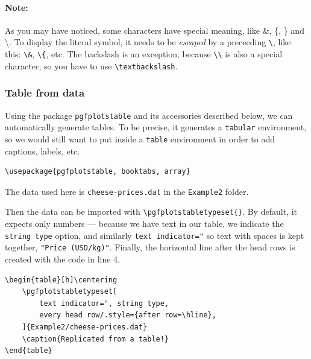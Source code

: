 \paragraph{Note:} As you may have noticed, some characters have special meaning, like \&, \{, \} and \textbackslash. To display the literal symbol, it needs to be \emph{escaped} by a preceeding \verb|\|, like this: \verb|\&|, \verb|\{|, etc. The backslash is an exception, because \verb|\\| is also a special character, so you have to use \verb|\textbackslash|.

\subsubsection{Table from data}
Using the package \texttt{pgfplotstable} and its accessories described below, we can automatically generate tables.
To be precise, it generates a \texttt{tabular} environment, so we would still want to put inside a \texttt{table} environment in order to add captions, labels, etc.
  
\begin{lstlisting}
\usepackage{pgfplotstable, booktabs, array}
\end{lstlisting}

The data used here is \texttt{cheese-prices.dat} in the \texttt{Example2} folder.


Then the data can be imported with \verb|\pgfplotstabletypeset{}|.
By default, it expects only numbers --- because we have text in our table, we indicate the \texttt{string type} option, and similarly \verb|text indicator="| so text with spaces is kept together, \verb|"Price (USD/kg)"|. 
Finally, the horizontal line after the head rows is created with the code in line 4.
\begin{lstlisting}
\begin{table}[h]\centering
    \pgfplotstabletypeset[
        text indicator=", string type,
        every head row/.style={after row=\hline},
    ]{Example2/cheese-prices.dat}
    \caption{Replicated from a table!}
\end{table}     
\end{lstlisting}

\begin{table}[h]\centering
    \caption{Replicated from a table!}
\end{table}

